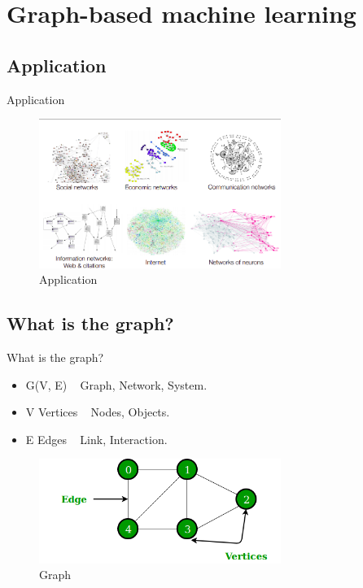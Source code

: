 \section{Graph-based machine learning}
\subsection{Application}
\begin{frame}{Application}
    \begin{figure}[htp]
        \centering
        \includegraphics[width=0.7\textwidth]{topics/201010-zhang2019comprehensive/assets/img/real-graph.png}
        \caption{Application}
        \label{fig:application}
    \end{figure}
\end{frame}
\subsection{What is the graph?}
\begin{frame}{What is the graph?}
    \begin{itemize}
        \item G(V, E) ~ Graph, Network, System.
        \item V Vertices ~ Nodes, Objects.
        \item E Edges ~ Link, Interaction.
    \end{itemize}
    \begin{figure}[htp]
        \centering
        \includegraphics[width=0.7\textwidth]{topics/201010-zhang2019comprehensive/assets/img/graph.png}
        \caption{Graph}
        \label{fig:graph}
    \end{figure}
\end{frame}
